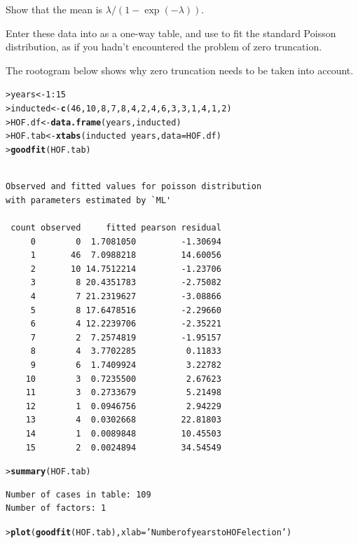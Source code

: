 \documentclass[10pt]{report}\usepackage[]{graphicx}\usepackage[]{color}
\makeatletter
\newcommand{\hlnum}[1]{\textcolor[rgb]{0.686,0.059,0.569}{#1}}%
\newcommand{\hlstr}[1]{\textcolor[rgb]{0.192,0.494,0.8}{#1}}%
\newcommand{\hlopt}[1]{\textcolor[rgb]{0,0,0}{#1}}%
\newcommand{\hlstd}[1]{\textcolor[rgb]{0.345,0.345,0.345}{#1}}%
\newcommand{\hlkwb}[1]{\textcolor[rgb]{0.69,0.353,0.396}{#1}}%
\newcommand{\hlkwc}[1]{\textcolor[rgb]{0.333,0.667,0.333}{#1}}%
\newcommand{\hlkwd}[1]{\textcolor[rgb]{0.737,0.353,0.396}{\textbf{#1}}}%
\newenvironment{kframe}{%
 \def\at@end@of@kframe{}%
 \ifinner\ifhmode%
  \def\at@end@of@kframe{\end{minipage}}%
  \begin{minipage}{\columnwidth}%
 \fi\fi%
 \def\FrameCommand##1{\hskip\@totalleftmargin \hskip-\fboxsep
 \colorbox{shadecolor}{##1}\hskip-\fboxsep
     \hskip-\linewidth \hskip-\@totalleftmargin \hskip\columnwidth}%
 \MakeFramed {\advance\hsize-\width
   \@totalleftmargin\z@ \linewidth\hsize
   \@setminipage}}%
 {\par\unskip\endMakeFramed%
 \at@end@of@kframe}
\newenvironment{knitrout}{}{} %
\renewenvironment{knitrout}{\small\renewcommand{\baselinestretch}{.85}}{} %
\makeatother
\begin{document}
\begin{Exercises}
\begin{enumerate*}
      \item Show that the mean is $\lambda/(1-\exp(-\lambda))$.
      \begin{ans}
      \end{ans}
      
      \item Enter these data into \R as a one-way table, and use  to fit the standard
      Poisson distribution, as if you hadn't encountered the problem of zero truncation.
      \begin{ans}
      The rootogram below shows why zero truncation needs to be taken into account.
\begin{knitrout}\footnotesize
{}\color{fgcolor}\begin{kframe}
\begin{alltt}
\hlstd{> }\hlstd{years} \hlkwb{<-} \hlnum{1}\hlopt{:}\hlnum{15}
\hlstd{> }\hlstd{inducted} \hlkwb{<-} \hlkwd{c}\hlstd{(}\hlnum{46}\hlstd{,} \hlnum{10}\hlstd{,}  \hlnum{8}\hlstd{,}  \hlnum{7}\hlstd{,}  \hlnum{8}\hlstd{,}  \hlnum{4}\hlstd{,}  \hlnum{2}\hlstd{,}  \hlnum{4}\hlstd{,}  \hlnum{6}\hlstd{,}  \hlnum{3}\hlstd{,}  \hlnum{3}\hlstd{,}  \hlnum{1}\hlstd{,}  \hlnum{4}\hlstd{,}  \hlnum{1}\hlstd{,}  \hlnum{2}\hlstd{)}
\hlstd{> }\hlstd{HOF.df} \hlkwb{<-} \hlkwd{data.frame}\hlstd{(years, inducted)}
\hlstd{> }\hlstd{HOF.tab} \hlkwb{<-} \hlkwd{xtabs}\hlstd{(inducted} \hlopt{~} \hlstd{years,} \hlkwc{data}\hlstd{=HOF.df)}
\hlstd{> }\hlkwd{goodfit}\hlstd{(HOF.tab)}
\end{alltt}
\begin{verbatim}

Observed and fitted values for poisson distribution
with parameters estimated by `ML' 

 count observed     fitted pearson residual
     0        0  1.7081050         -1.30694
     1       46  7.0988218         14.60056
     2       10 14.7512214         -1.23706
     3        8 20.4351783         -2.75082
     4        7 21.2319627         -3.08866
     5        8 17.6478516         -2.29660
     6        4 12.2239706         -2.35221
     7        2  7.2574819         -1.95157
     8        4  3.7702285          0.11833
     9        6  1.7409924          3.22782
    10        3  0.7235500          2.67623
    11        3  0.2733679          5.21498
    12        1  0.0946756          2.94229
    13        4  0.0302668         22.81803
    14        1  0.0089848         10.45503
    15        2  0.0024894         34.54549
\end{verbatim}
\begin{alltt}
\hlstd{> }\hlkwd{summary}\hlstd{(HOF.tab)}
\end{alltt}
\begin{verbatim}
Number of cases in table: 109 
Number of factors: 1 
\end{verbatim}
\begin{alltt}
\hlstd{> }\hlkwd{plot}\hlstd{(}\hlkwd{goodfit}\hlstd{(HOF.tab),} \hlkwc{xlab}\hlstd{=}\hlstr{'Number of years to HOF election'}\hlstd{)}
\end{alltt}
\end{kframe}


\end{knitrout}
\end{ans}
\end{enumerate*}
\end{Exercises}
\end{document}
